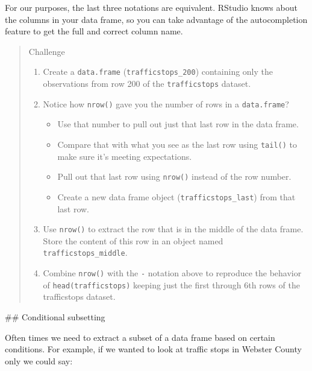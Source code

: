 \documentclass[
]{book}
\providecommand{\tightlist}{%
  \setlength{\itemsep}{0pt}\setlength{\parskip}{0pt}}
\begin{document}
For our purposes, the last three notations are equivalent. RStudio knows about
the columns in your data frame, so you can take advantage of the autocompletion
feature to get the full and correct column name.

\begin{quote}
Challenge

\begin{enumerate}
\def\labelenumi{\arabic{enumi}.}
\item
  Create a \texttt{data.frame} (\texttt{trafficstops\_200}) containing only the observations from
  row 200 of the \texttt{trafficstops} dataset.
\item
  Notice how \texttt{nrow()} gave you the number of rows in a \texttt{data.frame}?

  \begin{itemize}
  \tightlist
  \item
    Use that number to pull out just that last row in the data frame.
  \item
    Compare that with what you see as the last row using \texttt{tail()} to make
    sure it's meeting expectations.
  \item
    Pull out that last row using \texttt{nrow()} instead of the row number.
  \item
    Create a new data frame object (\texttt{trafficstops\_last}) from that last row.
  \end{itemize}
\item
  Use \texttt{nrow()} to extract the row that is in the middle of the data
  frame. Store the content of this row in an object named \texttt{trafficstops\_middle}.
\item
  Combine \texttt{nrow()} with the \texttt{-} notation above to reproduce the behavior of
  \texttt{head(trafficstops)} keeping just the first through 6th rows of the trafficstops
  dataset.
\end{enumerate}
\end{quote}

\#\# Conditional subsetting

Often times we need to extract a subset of a data frame based on certain conditions. For example, if we wanted to look at traffic stops in Webster County only we could say:
\end{document}
